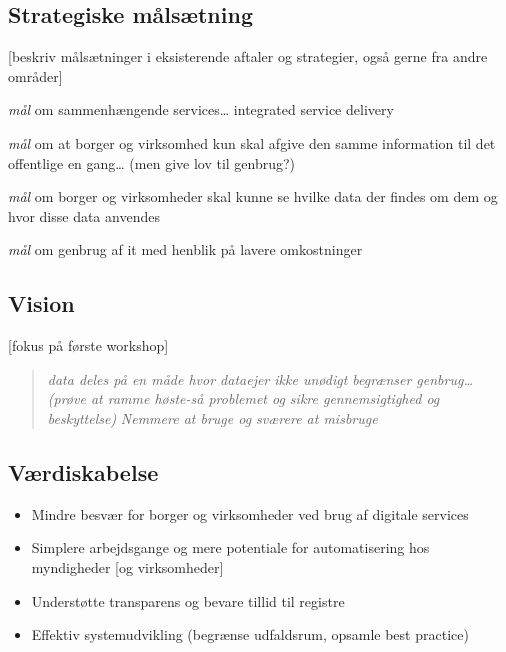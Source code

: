 \subsection{Strategiske målsætning}\label{strategiske-muxe5lsuxe6tning}

{[}beskriv målsætninger i eksisterende aftaler og strategier, også gerne
fra andre områder{]}

\begin{description}
\tightlist
\item[Interoperability]
\emph{mål} om sammenhængende services\ldots{} integrated service
delivery
\item[Once-only]
\emph{mål} om at borger og virksomhed kun skal afgive den samme
information til det offentlige en gang\ldots{} (men give lov til
genbrug?)
\item[Transperancy]
\emph{mål} om borger og virksomheder skal kunne se hvilke data der
findes om dem og hvor disse data anvendes
\item[Re-use]
\emph{mål} om genbrug af it med henblik på lavere omkostninger
\end{description}

\subsection{Vision}\label{vision}

{[}fokus på første workshop{]}

\begin{quote}
\emph{data deles på en måde hvor dataejer ikke unødigt begrænser
genbrug\ldots{}} \emph{(prøve at ramme høste-så problemet og sikre
gennemsigtighed og beskyttelse)} \emph{Nemmere at bruge og sværere at
misbruge}
\end{quote}

\subsection{Værdiskabelse}\label{vuxe6rdiskabelse}

\begin{itemize}
\tightlist
\item
  Mindre besvær for borger og virksomheder ved brug af digitale services
\item
  Simplere arbejdsgange og mere potentiale for automatisering hos
  myndigheder {[}og virksomheder{]}
\item
  Understøtte transparens og bevare tillid til registre
\item
  Effektiv systemudvikling (begrænse udfaldsrum, opsamle best practice)
\end{itemize}

